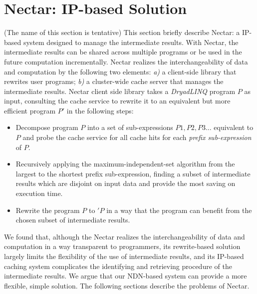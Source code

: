 \section{Nectar: IP-based Solution}
(The name of this section is tentative)
This section
briefly describe Nectar: a IP-based system designed to manage the intermediate
results. With Nectar, the intermediate results can be shared across multiple
programs or be used in the future computation incrementally.  Nectar realizes
the interchangeability of data and computation by the following two elements:
\emph{a)} a client-side library that rewrites user programs; \emph{b)} a
cluster-wide cache server that manages the intermediate results.  Nectar client
side library takes a \emph{DryadLINQ} program $P$ as input, consulting the
cache service to rewrite it to an equivalent but more efficient program $P'$ in
the following steps:

\begin{itemize} 

\item Decompose program $P$ into a set of sub-expressions ${P1, P2, P3 ...}$
equivalent to $P$ and probe the cache service for all cache hits for each
\emph{prefix sub-expression} of $P$.

\item Recursively applying the maximum-independent-set algorithm from the
largest to the shortest prefix sub-expression, finding a subset of intermediate
results which are disjoint on input data and provide the most saving on
execution time.


\item Rewrite the program $P$ to $'P$ in a way that the program can benefit
from the chosen subset of intermediate results. 

\end{itemize}

We found that, although the Nectar realizes the interchangeability of data and
computation in a way transparent to programmers, its rewrite-based solution
largely limits the flexibility of the use of intermediate results, and its
IP-based caching system complicates the identifying and retrieving procedure of
the intermediate results.  We argue that our NDN-based system can provide a
more flexible, simple solution.  The following sections describe the problems
of Nectar.

